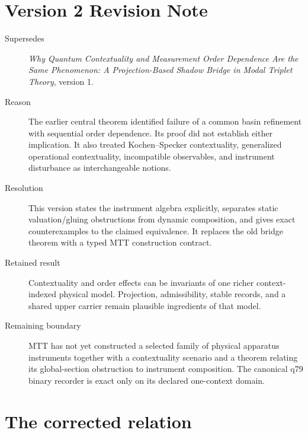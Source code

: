 \documentclass[11pt]{article}
\begin{document}
\section*{Version 2 Revision Note}
\begin{description}
\item[Supersedes] \emph{Why Quantum Contextuality and Measurement Order
Dependence Are the Same Phenomenon: A Projection-Based Shadow Bridge in Modal
Triplet Theory}, version 1.
\item[Reason] The earlier central theorem identified failure of a common basin
refinement with sequential order dependence. Its proof did not establish
either implication. It also treated Kochen--Specker contextuality, generalized
operational contextuality, incompatible observables, and instrument
disturbance as interchangeable notions.
\item[Resolution] This version states the instrument algebra explicitly,
separates static valuation/gluing obstructions from dynamic composition, and
gives exact counterexamples to the claimed equivalence. It replaces the old
bridge theorem with a typed MTT construction contract.
\item[Retained result] Contextuality and order effects can be invariants of one
richer context-indexed physical model. Projection, admissibility, stable
records, and a shared upper carrier remain plausible ingredients of that
model.
\item[Remaining boundary] MTT has not yet constructed a selected family of
physical apparatus instruments together with a contextuality scenario and a
theorem relating its global-section obstruction to instrument composition.
The canonical q79 binary recorder is exact only on its declared one-context
domain.
\end{description}

\tableofcontents

\section{The corrected relation}
\end{document}
